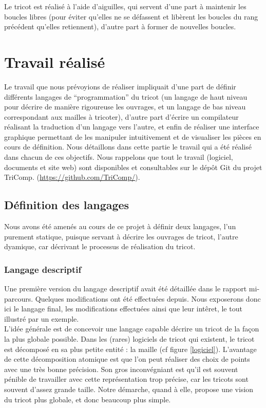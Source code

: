 \documentclass{article}
\begin{document}
Le tricot est réalisé à l'aide d'aiguilles, qui servent d'une part à
maintenir les boucles libres (pour éviter qu'elles ne se défassent et
libèrent les boucles du rang précédent qu'elles retiennent), d'autre
part à former de nouvelles boucles.

\newpage

\section{Travail réalisé}

Le travail que nous prévoyions de réaliser impliquait d'une part de
définir différents langages de ``programmation'' du tricot (un langage
de haut niveau pour décrire de manière rigoureuse les ouvrages, et un
langage de bas niveau correspondant aux mailles à tricoter), d'autre
part d'écrire un compilateur réalisant la traduction d'un langage vers
l'autre, et enfin de réaliser une interface graphique permettant de
les manipuler intuitivement et de visualiser les pièces en cours de
définition.  Nous détaillons dans cette partie le travail qui a été
réalisé dans chacun de ces objectifs. Nous rappelons que tout le
travail (logiciel, documents et site web) sont disponibles et
consultables sur le dépôt Git du projet
TriComp. (\url{https://github.com/TriComp/}).

\subsection{Définition des langages}

Nous avons été amenés au cours de ce projet à définir deux langages,
l'un purement statique, puisque servant à décrire les ouvrages de
tricot, l'autre dyamique, car décrivant le processus de réalisation du
tricot.

\subsubsection{Langage descriptif}

Une première version du langage descriptif avait été détaillée dans le
rapport mi-parcours. Quelques modifications ont été effectuées
depuis. Nous exposerons donc ici le langage final, les modifications
effectuées ainsi que leur intêret, le tout illustré par un exemple. \\

L'idée générale est de concevoir une langage capable décrire un tricot
de la façon la plus globale possible. Dans les (rares) logiciels de
tricot qui existent, le tricot est décomposé en sa plus petite entité
: la maille (cf figure \ref{logiciel}). L'avantage de cette
décomposition atomique est que l'on peut réaliser des choix de points
avec une très bonne précision.
 Son gros inconvégniant est qu'il est souvent
pénible de travailler avec cette représentation trop précise, car les tricots 
sont souvent d'assez grande taille. %
Notre démarche, quand à elle, propose une vision du tricot plus globale, 
et donc beaucoup plus simple.
\end{document}
